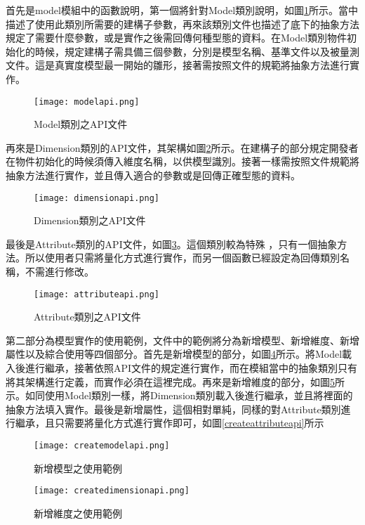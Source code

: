 首先是model模組中的函數說明，第一個將針對Model類別說明，如圖\ref{modelapi}所示。當中描述了使用此類別所需要的建構子參數，再來該類別文件也描述了底下的抽象方法規定了需要什麼參數，或是實作之後需回傳何種型態的資料。在Model類別物件初始化的時候，規定建構子需具備三個參數，分別是模型名稱、基準文件以及被量測文件。這是真實度模型最一開始的雛形，接著需按照文件的規範將抽象方法進行實作。
\begin{figure}[H]
\centering
\graphicspath{{/Users/FUDA/Documents/masterThesis/image/}}
\texttt{[image: modelapi.png]}
\caption{Model類別之API文件}
\label{modelapi}
\end{figure}

再來是Dimension類別的API文件，其架構如圖\ref{dimensionapi}所示。在建構子的部分規定開發者在物件初始化的時候須傳入維度名稱，以供模型識別。接著一樣需按照文件規範將抽象方法進行實作，並且傳入適合的參數或是回傳正確型態的資料。
\begin{figure}[H]
\centering
\graphicspath{{/Users/FUDA/Documents/masterThesis/image/}}
\texttt{[image: dimensionapi.png]}
\caption{Dimension類別之API文件}
\label{dimensionapi}
\end{figure}

最後是Attribute類別的API文件，如圖\ref{attributeapi}。這個類別較為特殊 ，只有一個抽象方法。所以使用者只需將量化方式進行實作，而另一個函數已經設定為回傳類別名稱，不需進行修改。
\begin{figure}[H]
\centering
\graphicspath{{/Users/FUDA/Documents/masterThesis/image/}}
\texttt{[image: attributeapi.png]}
\caption{Attribute類別之API文件}
\label{attributeapi}
\end{figure}

第二部分為模型實作的使用範例，文件中的範例將分為新增模型、新增維度、新增屬性以及綜合使用等四個部分。首先是新增模型的部分，如圖\ref{createmodelapi}所示。將Model載入後進行繼承，接著依照API文件的規定進行實作，而在模組當中的抽象類別只有將其架構進行定義，而實作必須在這裡完成。再來是新增維度的部分，如圖\ref{createdimensionapi}所示。如同使用Model類別一樣，將Dimension類別載入後進行繼承，並且將裡面的抽象方法填入實作。最後是新增屬性，這個相對單純，同樣的對Attribute類別進行繼承，且只需要將量化方式進行實作即可，如圖\ref{createattributeapi}所示
\begin{figure}[H]
\centering
\graphicspath{{/Users/FUDA/Documents/masterThesis/image/}}
\texttt{[image: createmodelapi.png]}
\caption{新增模型之使用範例}
\label{createmodelapi}
\end{figure}

\begin{figure}[H]
\centering
\graphicspath{{/Users/FUDA/Documents/masterThesis/image/}}
\texttt{[image: createdimensionapi.png]}
\caption{新增維度之使用範例}
\label{createdimensionapi}
\end{figure}

